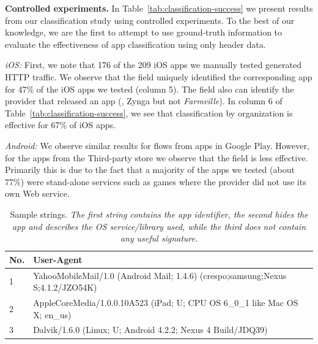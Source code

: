 
\noindent\textbf{Controlled experiments.}
In Table~\ref{tab:classification-success} we present results from our classification study using controlled experiments. To 
the best of our knowledge, we are the first to attempt to use ground-truth information to evaluate the 
effectiveness of app classification using only header data.
 

\emph{iOS:}
First, we note that 176 of the 209 iOS apps we manually tested generated HTTP traffic.
We observe that the \httphost field uniquely identified the corresponding app for 47\% of the iOS apps we tested (column 5).
The \httphost field also can identify the provider that released an app (\eg, Zynga but not \emph{Farmville}).
In column 6 of Table~\ref{tab:classification-success}, we see that classification by organization is effective for 67\% of iOS apps. 


\emph{Android:} We observe similar results for flows from apps in Google Play.
However, for the apps from the Third-party store we observe that the \httphost field is less effective. 
Primarily this is due to the fact that a majority of the apps we tested (about 77\%) were stand-alone services such as games where the provider did not use its own Web service. %

\begin{table}
\begin{small}
\begin{tabular}{|l|p{}|}
\hline
{\bf No. } & {\bf User-Agent}\tabularnewline
\hline
1 & YahooMobileMail/1.0 (Android Mail; 1.4.6) (crespo;samsung;Nexus S;4.1.2/JZO54K)\tabularnewline
\hline
2 & AppleCoreMedia/1.0.0.10A523 (iPad; U; CPU OS 6\_0\_1 like Mac OS X; en\_us) \tabularnewline
\hline
3 & Dalvik/1.6.0 (Linux; U; Android 4.2.2; Nexus 4 Build/JDQ39) \tabularnewline
\hline
\end{tabular}
\end{small}
\caption{Sample \useragent strings. \emph{The first string contains the app identifier, the second hides the app and describes the OS service/library used, while the third does not contain any useful signature.}}
\label{tab:user-agent}
\end{table}


